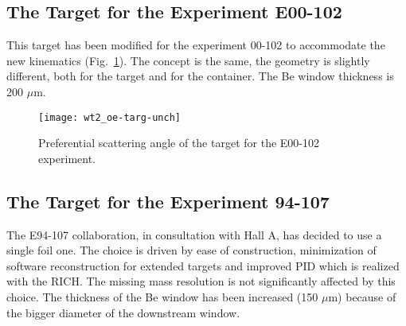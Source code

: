 {\subsection{The Target for the Experiment E00-102}

This target has been modified for the experiment 00-102 to accommodate
the new kinematics (Fig.~\ref{fig:wt_oee-kin}). The concept is the same,
the geometry is slightly different, both for the target and for the
container.%
The Be window thickness
is 200 $\mu $m.
\begin{figure}
\begin{center}\texttt{[image: wt2\_oe-targ-unch]}\end{center}
\caption{Preferential scattering angle of the target for the E00-102 experiment.}
\label{fig:wt_oee-kin}
\end{figure}



\subsection{The Target for the Experiment 94-107}

The E94-107 collaboration, in consultation with Hall A, has decided
to use a single foil one. The choice is driven by ease of construction,
minimization of software reconstruction for extended targets and improved
PID which is realized with the RICH. The missing mass resolution is
not significantly affected by this choice. The thickness of the Be
window has been increased (150 $\mu $m) because of the bigger diameter
of the downstream window.%

} %

